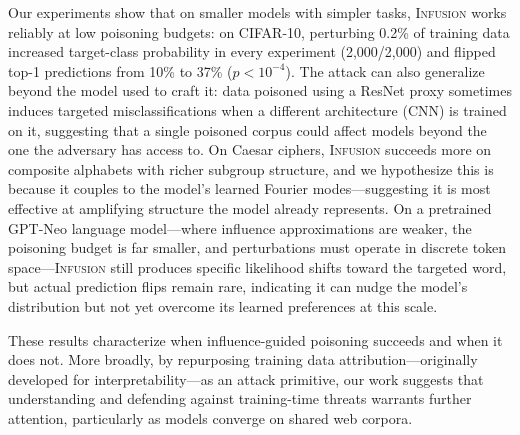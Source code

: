 \documentclass{article}
\theoremstyle{plain}
\theoremstyle{definition}
\theoremstyle{remark}
\begin{document}
Our experiments show that on smaller models with simpler tasks, \textsc{Infusion} works reliably at low poisoning budgets: on CIFAR-10, perturbing 0.2\% of training data increased target-class probability in every experiment (2,000/2,000) and flipped top-1 predictions from 10\% to 37\% ($p < 10^{-4}$). The attack can also generalize beyond the model used to craft it: data poisoned using a ResNet proxy sometimes induces targeted misclassifications when a different architecture (CNN) is trained on it, suggesting that a single poisoned corpus could affect models beyond the one the adversary has access to. On Caesar ciphers, \textsc{Infusion} succeeds more on composite alphabets with richer subgroup structure, and we hypothesize this is because it couples to the model's learned Fourier modes---suggesting it is most effective at amplifying structure the model already represents. On a pretrained GPT-Neo language model---where influence approximations are weaker, the poisoning budget is far smaller, and perturbations must operate in discrete token space---\textsc{Infusion} still produces specific likelihood shifts toward the targeted word, but actual prediction flips remain rare, indicating it can nudge the model's distribution but not yet overcome its learned preferences at this scale.

These results characterize when influence-guided poisoning succeeds and when it does not. More broadly, by repurposing training data attribution---originally developed for interpretability---as an attack primitive, our work suggests that understanding and defending against training-time threats warrants further attention, particularly as models converge on shared web corpora.





\end{document}
